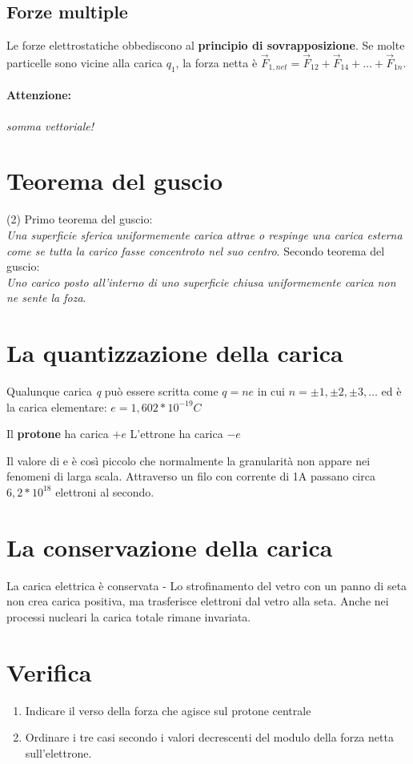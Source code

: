 \subsection{Forze multiple}
Le forze elettrostatiche obbediscono al \textbf{principio di sovrapposizione}.
Se molte particelle sono vicine alla carica $q_1$, la forza netta è $\vec{F}_{1,net}=\vec{F}_{12}+\vec{F}_{14}+\dots+\vec{F}_{1n}$.
\paragraph{Attenzione:} \textit{somma vettoriale!}
\section{Teorema del guscio}
\begin{tasks}(2)
  \task Primo teorema del guscio:\\
  \textit{Una superficie sferica uniformemente carica attrae o respinge una carica esterna come se tutta la carico fasse concentroto
    nel suo centro}.
  \task Secondo teorema del guscio:\\
  \textit{Uno carico posto all'interno di uno superficie chiusa uniformemente carica non ne sente la foza}.
\end{tasks}
\section{La quantizzazione della carica}
Qualunque carica \textit{q} può essere scritta come $q=ne$ in cui $n=\pm 1,\pm 2, \pm 3, \dots$ ed è la carica elementare: $e = 1,602*10^{-19}C$
\begin{tasks}
  \task Il \textbf{protone} ha carica $+e$
  \task L'ettrone ha carica $-e$
\end{tasks}

Il valore di e è così piccolo che normalmente la granularità non appare nei fenomeni di larga scala. Attraverso un filo con corrente di 1A passano circa $6,2*10^{18}$ elettroni al secondo.

\section{La conservazione della carica}
La carica elettrica è conservata - Lo strofinamento del vetro con un panno di seta non crea carica positiva, ma trasferisce elettroni dal vetro alla seta. Anche nei processi nucleari la carica totale rimane invariata.
\section{Verifica}
\begin{enumerate}
\item Indicare il verso della forza che agisce sul protone centrale
\item Ordinare i tre casi secondo i valori decrescenti del modulo della forza netta sull'elettrone.
\end{enumerate}
